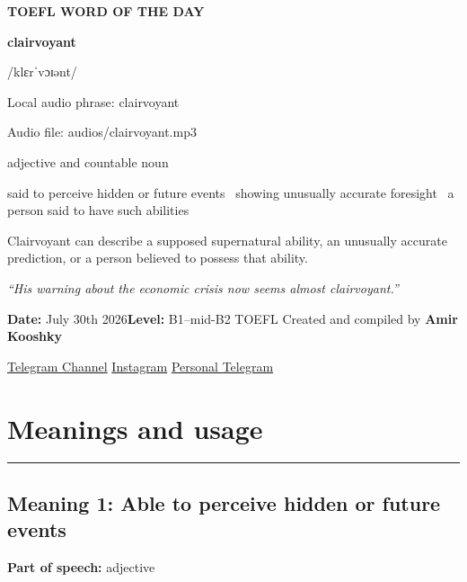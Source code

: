 \documentclass[11pt]{article}
\newcommand{\sectionrule}{\par\vspace{-0.5em}\noindent\textcolor{Accent}{\rule{\linewidth}{0.6pt}}\par}
\begin{document}
\begin{center}
{\sffamily\bfseries\color{Accent} TOEFL WORD OF THE DAY\par}
\vspace{8mm}
{\fontsize{42}{48}\selectfont\bfseries clairvoyant\par}
\vspace{2mm}
{\Large\sffamily\color{Accent} /klɛrˈvɔɪənt/\par}
\vspace{2mm}
{\small\sffamily Local audio phrase: clairvoyant\par}
{\small\sffamily Audio file: audios/clairvoyant.mp3\par}
\vspace{2mm}
{\large\sffamily\color{Muted} adjective and countable noun\par}
\vspace{5mm}
{\sffamily said to perceive hidden or future events \textbullet\ showing unusually accurate foresight \textbullet\ a person said to have such abilities\par}
\vspace{6mm}
{\large Clairvoyant can describe a supposed supernatural ability, an unusually accurate prediction, or a person believed to possess that ability.\par}
\vspace{6mm}
\begin{minipage}{0.84\textwidth}
\itshape “His warning about the economic crisis now seems almost clairvoyant.”
\end{minipage}\par
\vspace{10mm}
\textbf{Date:} July 30th 2026\quad\textbullet\quad \textbf{Level:} B1--mid-B2 TOEFL
\vfill
Created and compiled by \textbf{Amir Kooshky}\par
\vspace{2mm}
\href{https://t.me/KooshkyTOEFL}{Telegram Channel}\quad\textbullet\quad
\href{https://www.instagram.com/kooshkytoefl}{Instagram}\quad\textbullet\quad
\href{https://t.me/KooshkyTOEFL\_pv}{Personal Telegram}
\end{center}
\newpage
\tableofcontents
\newpage

\section{Meanings and usage}
\sectionrule
\subsection{Meaning 1: Able to perceive hidden or future events}
\textbf{Part of speech:} adjective
\end{document}
